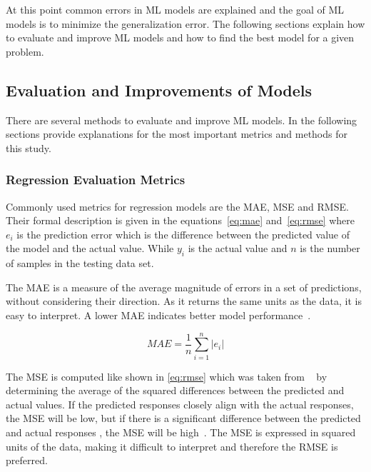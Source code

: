 At this point common errors in ML models are explained and the goal of ML models is to minimize the generalization
error.
The following sections explain how to evaluate and improve ML models and how to find the best model for a given
problem.


\subsection{Evaluation and Improvements of Models}\label{subsec:evaluations-and-improvements-of-models}
There are several methods to evaluate and improve ML models.
In the following sections provide explanations for the most important metrics and methods for this study.


\subsubsection{Regression Evaluation Metrics}\label{subsubsec:regression-metrics}
Commonly used metrics for regression models are the \ac{MAE}, \ac{MSE} and \ac{RMSE}.
Their formal description is given in the equations~\ref{eq:mae} and~\ref{eq:rmse} where
$e_i$ is the prediction error which is the difference between the predicted value of the model and the actual value.
While $y_i$ is the actual value and $n$ is the number of samples in the testing data set.

The MAE is a measure of the average magnitude of errors in a set of predictions, without considering their direction.
As it returns the same units as the data, it is easy to interpret.
A lower MAE indicates better model performance~\cite[pp. 1248]{chai2014root}.

\begin{tcolorbox}[arc=0pt,boxrule=0.5pt]
    \begin{equation}
        MAE = \frac{1}{n} \sum_{i=1}^{n} |e_i|
        \label{eq:mae}
    \end{equation}
\end{tcolorbox}

The MSE is computed like shown in \cref{eq:rmse} which was taken from \cite{chai2014root}
~\cite[p. 1248]{chai2014root} by
determining the average of the squared differences between the predicted and actual values.
If the predicted responses closely align with the actual responses, the MSE will be low, but if there is a significant
difference between the predicted and actual responses , the MSE will be high~\cite[p. 30]{hastie2009elements}.
The MSE is expressed in squared units of the data, making it difficult to interpret and therefore the RMSE is preferred.

